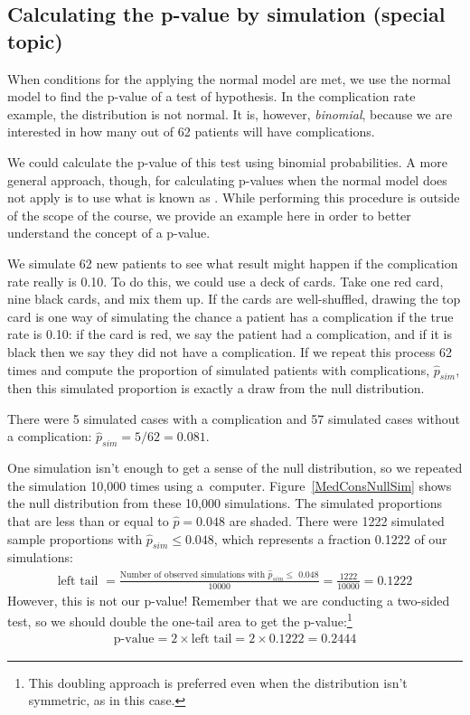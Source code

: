 \subsection{Calculating the p-value by simulation (special topic)}

When conditions for the applying the normal model are met, we use the normal model to find the p-value of a test of hypothesis. In the complication rate example, the distribution is not normal. It is, however, \emph{binomial}, because we are interested in how many out of 62 patients will have complications.

We could calculate the p-value of this test using binomial probabilities. A more general approach, though, for calculating p-values when the normal model does not apply is to use what is known as . While performing this procedure is outside of the scope of the course, we provide an example here in order to better understand the concept of a p-value.

We simulate 62 new patients to see what result might happen if the complication rate really is 0.10. To do this, we could use a deck of cards. Take one red card, nine black cards, and mix them up. If the cards are well-shuffled, drawing the top card is one way of simulating the chance a patient has a complication if the true rate is 0.10: if the card is red, we say the patient had a complication, and if it is black then we say they did not have a complication. If we repeat this process 62 times and compute the proportion of simulated patients with complications, $\hat{p}_{sim}$, then this simulated proportion is exactly a draw from the null distribution.

There were 5 simulated cases with a complication and 57 simulated cases without a complication: $\hat{p}_{sim} = 5/62 = 0.081$.

One simulation isn't enough to get a sense of the null distribution, so we repeated the simulation 10,000 times using a~computer. Figure~\ref{MedConsNullSim} shows the null distribution from these 10,000 simulations. The simulated proportions that are less than or equal to $\hat{p}=0.048$ are shaded. There were 1222 simulated sample proportions with $\hat{p}_{sim} \leq 0.048$, which represents a fraction 0.1222 of our simulations:
\begin{align*}
\text{left tail }
	= \frac{\text{Number of observed simulations with }\hat{p}_{sim}\leq\text{ 0.048}}{10000}
	= \frac{1222}{10000} = 0.1222
\end{align*}
However, this is not our p-value! Remember that we are conducting a two-sided test, so we should double the one-tail area to get the p-value:\footnote{This doubling approach is preferred even when the distribution isn't symmetric, as in this case.}
\begin{align*}
\text{p-value} = 2 \times \text{left tail} = 2 \times 0.1222 = 0.2444
\end{align*}

